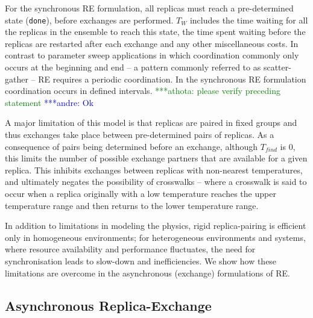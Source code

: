 \documentclass{rspublic}
\newcommand{\alnote}[1]{ {\textcolor{blue} { ***andre: #1 }}}
\newcommand{\athotanote}[1]{ {\textcolor{green} { ***athota: #1 }}}
\newcommand{\alnote}[1]{}
\newcommand{\athotanote}[1]{}
\begin{document}

For the synchronous RE formulation, all replicas must reach a
pre-determined state (\texttt{done}), before exchanges are performed.
$T_W$ includes the time waiting for all the replicas in the ensemble
to reach this state, the time spent waiting before the replicas are
restarted after each exchange and any other miscellaneous costs. 
In contrast to parameter sweep applications in which coordination
commonly only occurs at the beginning and end -- a pattern commonly referred to as
scatter-gather -- RE requires a periodic coordination. In the synchronous RE
formulation coordination occurs in defined intervals. 
\athotanote{please verify preceding statement} \alnote{Ok} 

A major limitation of this model is that replicas are paired in fixed
groups and thus exchanges take place between pre-determined pairs of
replicas.  As a consequence of pairs being determined before an
exchange, although $T_{find}$ is $0$, this limits the number of possible
exchange partners that are available for a given replica. This
inhibits exchanges between replicas with non-nearest temperatures, and
ultimately negates the possibility of crosswalks -- where a crosswalk
is said to occur when a replica originally with a low temperature
reaches the upper temperature range and then returns to the lower
temperature range.

In addition to limitations in modeling the physics, rigid
replica-pairing is efficient only in homogeneous environments; for
heterogeneous environments and systems, where resource availability and
performance fluctuates, the need for synchronisation leads to
slow-down and inefficiencies. We show how these limitations are
overcome in the asynchronous (exchange) formulations of RE.

\subsection{Asynchronous Replica-Exchange}

\end{document}
